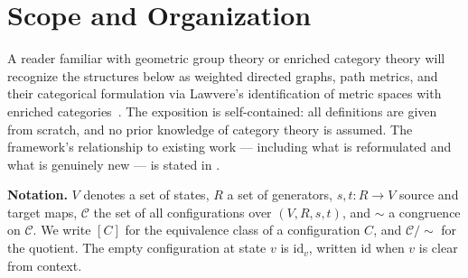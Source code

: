\documentclass{article}
\theoremstyle{definition}
\theoremstyle{remark}
\newcommand{\RC}{\mathcal{C}}
\newcommand{\id}{\mathrm{id}}
\begin{document}
\begin{abstract}
The separation of layers makes explicitly askable a question that
classical treatments obscure: what geometric structure does a
specific congruence law produce in the nerve of the free
category, independently of the quotient it defines?

This question is developed in , the principal
new contribution of this paper. Given a group presentation
$\langle R \mid \mathcal{L} \rangle$, we define a depth
filtration on both the nerve of the free group $F(R)$ and the
nerve of the quotient group $G = F(R)/{\sim}$. Treating this
filtration as a persistence module in the sense of topological
data analysis, we prove three structural theorems: the free
group filtration has exactly $|R|$ homology classes in degree~1,
each born at depth~1 with infinite persistence, and nothing in
higher degrees; a commutativity law $a \cdot b \sim b \cdot a$
creates a new class in $H_2$ at depth~2 with infinite
persistence; and a torsion law $a^n \sim \id$ modifies the
persistence of the generator's $H_1$ class at depth~$n$. The
\emph{presentation persistence diagram}, defined as the
difference between the free and quotient persistence diagrams,
is an invariant of the presentation that records when and how
each congruence law reshapes the topology of the classifying
space. An open-source implementation is described that computes
this comparison directly from a presentation, making the
invariant accessible without triangulation.
\end{abstract}

\section*{Scope and Organization}

A reader familiar with geometric group theory or enriched category
theory will recognize the structures below as weighted directed
graphs, path metrics, and their categorical formulation via
Lawvere's identification of metric spaces with enriched
categories~\cite{lawvere}. The exposition is self-contained: all
definitions are given from scratch, and no prior knowledge of
category theory is assumed. The framework's relationship to
existing work --- including what is reformulated and what is
genuinely new --- is stated in .

\medskip
\noindent\textbf{Notation.} $V$ denotes a set of states,
$R$ a set of generators, $s, t : R \to V$ source and target maps,
$\RC$ the set of all configurations over $(V, R, s, t)$, and
$\sim$ a congruence on $\RC$. We write $[C]$ for the equivalence
class of a configuration $C$, and $\RC/{\sim}$ for the quotient.
The empty configuration at state $v$ is $\id_v$, written $\id$
when $v$ is clear from context.
\end{document}
